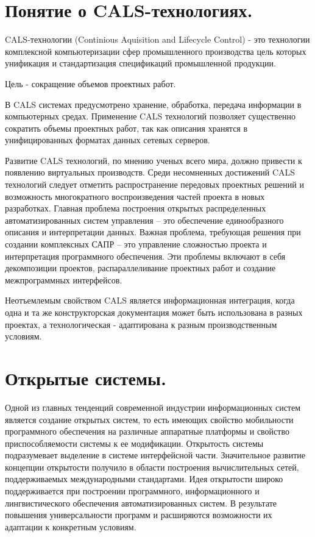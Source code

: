 \documentclass[unicode, 12pt, a4paper, oneside]{article}
\begin{document}
\section{Понятие о CALS-технологиях.}

CALS-технологии (Continious Aquisition and Lifecycle Control) - это технологии комплексной компьютеризации сфер промышленного производства цель которых унификация и стандартизация спецификаций промышленной продукции.

Цель - сокращение объемов проектных работ.

В CALS системах предусмотрено хранение, обработка, передача информации в компьютерных средах.
Применение CALS технологий позволяет существенно сократить объемы проектных работ, так как описания хранятся в унифицированных форматах данных сетевых серверов.

Развитие CALS технологий, по мнению ученых всего мира, должно привести к появлению виртуальных производств. Среди несомненных достижений CALS технологий следует отметить распространение передовых проектных решений и возможность многократного воспроизведения частей проекта в новых разработках. Главная проблема построения открытых распределенных автоматизированных систем управления – это обеспечение единообразного описания и интерпретации данных. Важная проблема, требующая решения при создании комплексных САПР – это управление сложностью проекта и интерпретация программного обеспечения. Эти проблемы включают в себя декомпозиции проектов, распараллеливание проектных работ и создание межпрограммных интерфейсов.

Неотъемлемым свойством CALS является информационная интеграция, когда одна и та же конструкторская документация может быть использована в разных проектах, а технологическая - адаптирована к разным производственным условиям.

\section{Открытые системы.}

Одной из главных тенденций современной индустрии информационных систем является создание открытых систем, то есть имеющих свойство мобильности программного обеспечения на различные аппаратные платформы и свойство приспособляемости системы к ее модификации. Открытость системы подразумевает выделение в системе интерфейсной части. Значительное развитие концепции открытости получило в области построения вычислительных сетей, поддерживаемых международными стандартами. Идея открытости широко поддерживается при построении программного, информационного и лингвистического обеспечения автоматизированных систем. В результате повышения универсальности программ и расширяются возможности их адаптации к конкретным условиям.
\end{document}
